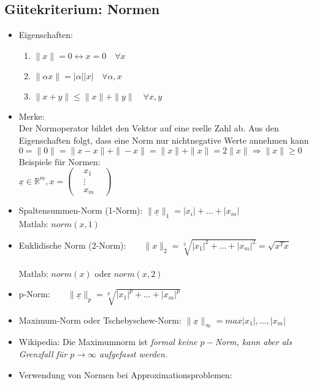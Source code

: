 \documentclass[ngerman]{tudscrreprt}
\begin{document}
		\subsection{G\"utekriterium: Normen}
		\begin{itemize}
		\item Eigenschaften: 
		\begin{enumerate}
		\item $\parallel x \parallel = 0 \leftrightarrow x= 0 \quad \forall x$
		\item $\parallel \alpha x \parallel = |\alpha| |x| \quad \forall \alpha, x$
		\item $\parallel x + y \parallel \leq \parallel x \parallel + \parallel y \parallel \quad \forall x,y$ 
		\end{enumerate}
		\item Merke:\\
		Der Normoperator bildet den Vektor auf eine reelle Zahl ab. Aus den Eigenschaften folgt, dass eine Norm nur nichtnegative Werte annehmen kann \\
		$ 0 = \| 0 \| = \| x-x \| + \| -x \| = \| x \| + \| x \| = 2 \| x \| \Rightarrow \| x \| \geq 0$\\
		Beispiele für Normen:\\

		$\underline{x} \in \mathbb{R}^m , x= 
		\begin{pmatrix}
		&x_1& \\
		&\vdots&\\
		&x_m& 
		\end{pmatrix}
		$
		\end{itemize}
		\begin{itemize}
		\item Spaltensummen-Norm (1-Norm):
		$\|\underline{x}\|_1 = |x_i| + \dots +|x_m|$
		\\ Matlab: $norm(x,1)$\\
		\item Euklidische Norm (2-Norm):$\qquad \|x\|_2 = \sqrt[2]{|x_1|^2 + \dots + |x_m|^2} = \sqrt{x^T x}$\\
		\\ Matlab: $norm(x)$ oder $norm(x,2)$\\
		\item p-Norm:$\qquad \|\underline{x}\|_p = \sqrt[p]{|x_1|^p + \dots + |x_m|^p}$\\
		\item Maximum-Norm oder Tschebyschew-Norm:
		$\|\underline{x}\|_\infty = max{|x_1| , \dots , |x_m|}$\\
		\item Wikipedia: Die Maximumnorm ist \textit{formal keine $p-$Norm, kann aber als Grenzfall für $p\rightarrow \infty$ aufgefasst werden.}
		\item Verwendung von Normen bei Approximationsproblemen:
		\end{itemize}
\end{document}

